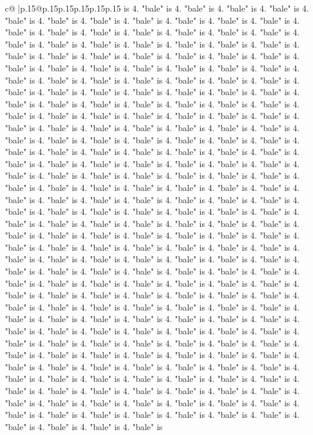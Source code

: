 \documentclass{article}
\begin{document}
{\begin{supertabular}{c@{$\;$}|p{.15\linewidth}@{}p{.15\linewidth}p{.15\linewidth}p{.15\linewidth}p{.15\linewidth}p{.15\linewidth}}
{{{is 4. "bale" is 4. "bale" is 4. "bale" is 4. "bale" is 4. "bale" is 4. "bale" is 4. "bale" is 4. "bale" is 4. "bale" is 4. "bale" is 4. "bale" is 4. "bale" is 4. "bale" is 4. "bale" is 4. "bale" is 4. "bale" is 4. "bale" is 4. "bale" is 4. "bale" is 4. "bale" is 4. "bale" is 4. "bale" is 4. "bale" is 4. "bale" is 4. "bale" is 4. "bale" is 4. "bale" is 4. "bale" is 4. "bale" is 4. "bale" is 4. "bale" is 4. "bale" is 4. "bale" is 4. "bale" is 4. "bale" is 4. "bale" is 4. "bale" is 4. "bale" is 4. "bale" is 4. "bale" is 4. "bale" is 4. "bale" is 4. "bale" is 4. "bale" is 4. "bale" is 4. "bale" is 4. "bale" is 4. "bale" is 4. "bale" is 4. "bale" is 4. "bale" is 4. "bale" is 4. "bale" is 4. "bale" is 4. "bale" is 4. "bale" is 4. "bale" is 4. "bale" is 4. "bale" is 4. "bale" is 4. "bale" is 4. "bale" is 4. "bale" is 4. "bale" is 4. "bale" is 4. "bale" is 4. "bale" is 4. "bale" is 4. "bale" is 4. "bale" is 4. "bale" is 4. "bale" is 4. "bale" is 4. "bale" is 4. "bale" is 4. "bale" is 4. "bale" is 4. "bale" is 4. "bale" is 4. "bale" is 4. "bale" is 4. "bale" is 4. "bale" is 4. "bale" is 4. "bale" is 4. "bale" is 4. "bale" is 4. "bale" is 4. "bale" is 4. "bale" is 4. "bale" is 4. "bale" is 4. "bale" is 4. "bale" is 4. "bale" is 4. "bale" is 4. "bale" is 4. "bale" is 4. "bale" is 4. "bale" is 4. "bale" is 4. "bale" is 4. "bale" is 4. "bale" is 4. "bale" is 4. "bale" is 4. "bale" is 4. "bale" is 4. "bale" is 4. "bale" is 4. "bale" is 4. "bale" is 4. "bale" is 4. "bale" is 4. "bale" is 4. "bale" is 4. "bale" is 4. "bale" is 4. "bale" is 4. "bale" is 4. "bale" is 4. "bale" is 4. "bale" is 4. "bale" is 4. "bale" is 4. "bale" is 4. "bale" is 4. "bale" is 4. "bale" is 4. "bale" is 4. "bale" is 4. "bale" is 4. "bale" is 4. "bale" is 4. "bale" is 4. "bale" is 4. "bale" is 4. "bale" is 4. "bale" is 4. "bale" is 4. "bale" is 4. "bale" is 4. "bale" is 4. "bale" is 4. "bale" is 4. "bale" is 4. "bale" is 4. "bale" is 4. "bale" is 4. "bale" is 4. "bale" is 4. "bale" is 4. "bale" is 4. "bale" is 4. "bale" is 4. "bale" is 4. "bale" is 4. "bale" is 4. "bale" is 4. "bale" is 4. "bale" is 4. "bale" is 4. "bale" is 4. "bale" is 4. "bale" is 4. "bale" is 4. "bale" is 4. "bale" is 4. "bale" is 4. "bale" is 4. "bale" is 4. "bale" is 4. "bale" is 4. "bale" is 4. "bale" is 4. "bale" is 4. "bale" is 4. "bale" is 4. "bale" is 4. "bale" is 4. "bale" is 4. "bale" is 4. "bale" is 4. "bale" is 4. "bale" is 4. "bale" is 4. "bale" is 4. "bale" is 4. "bale" is 4. "bale" is 4. "bale" is 4. "bale" is 4. "bale" is 4. "bale" is 4. "bale" is 4. "bale" is 4. "bale" is 4. "bale" is 4. "bale" is 4. "bale" is 4. "bale" is 4. "bale" is 4. "bale" is 4. "bale" is 4. "bale" is 4. "bale" is 4. "bale" is 4. "bale" is 4. "bale" is 4. "bale" is 4. "bale" is 4. "bale" is 4. "bale" is 4. "bale" is 4. "bale" is 4. "bale" is 4. "bale" is 4. "bale" is 4. "bale" is 4. "bale" is 4. "bale" is 4. "bale" is 4. "bale" is 4. "bale" is 4. "bale" is 4. "bale" is 4. "bale" is 4. "bale" is 4. "bale" is 4. "bale" is 4. "bale" is 4. "bale" is 4. "bale" is 4. "bale" is 4. "bale" is 4. "bale" is 4. "bale" is 4. "bale" is 4. "bale" is 4. "bale" is 4. "bale" is 4. "bale" is 4. "bale" is 4. "bale" is 4. "bale" is 4. "bale" is }}}
\end{supertabular}}
\end{document}
